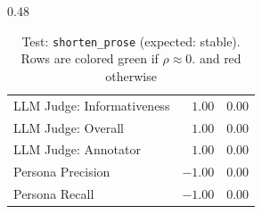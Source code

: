 \begin{table}[htbp]
\begin{subtable}[t]{0.48\textwidth}
\begin{tabular}{lrr}
\rowcolor{matchFalse} LLM Judge: Informativeness            &   $1.00$ &  0.00 \\
\rowcolor{matchFalse} LLM Judge: Overall                    &   $1.00$ &  0.00 \\
\rowcolor{matchFalse} LLM Judge: Annotator        &   $1.00$ &  0.00 \\
\rowcolor{matchFalse} Persona Precision                     &  $-1.00$ &  0.00 \\
\rowcolor{matchFalse} Persona Recall                        &  $-1.00$ &  0.00 \\
\bottomrule
\end{tabular}
\caption{LLM metrics}
\end{subtable}
\caption[Test: \texttt{shorten\_prose} (expected: stable).]{Test: \texttt{shorten\_prose} (expected: stable). Rows are colored green if $\rho\approx0$. and red otherwise}
\label{tab:shorten_prose}
\end{table}